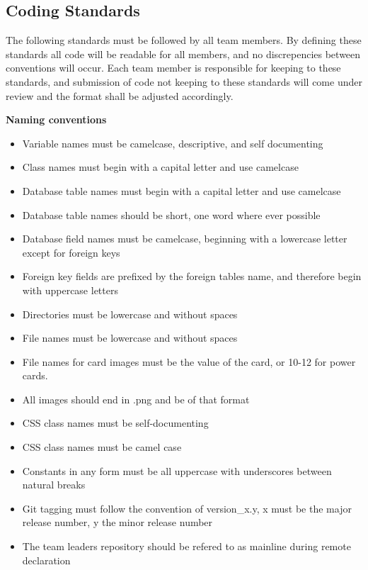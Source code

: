 \documentclass[12pt]{IEEEtran}
\begin{document}
\subsection{Coding Standards}
\label{subsec:coding}

	The following standards must be followed by all team members. By defining these standards all code will be readable for 		all members, and no discrepencies between conventions will occur. Each team member is responsible for keeping to these 	standards, and submission of code not keeping to these standards will come under review and the format shall be 			adjusted accordingly. 

	\bfseries Naming conventions \mdseries

	\begin{itemize}
		\item Variable names must be camelcase, descriptive, and self documenting
		\item Class names must begin with a capital letter and use camelcase 
		\item Database table names must begin with a capital letter and use camelcase
		\item Database table names should be short, one word where ever possible
		\item Database field names must be camelcase, beginning with a lowercase letter except for foreign keys
		\item Foreign key fields are prefixed by the foreign tables name, and therefore begin with uppercase letters
		\item Directories must be lowercase and without spaces
		\item File names must be lowercase and without spaces
		\item File names for card images must be the value of the card, or 10-12 for power cards.
		\item All images should end in .png and be of that format
		\item CSS class names must be self-documenting
		\item CSS class names must be camel case
		\item Constants in any form must be all uppercase with underscores between natural breaks
		\item Git tagging must follow the convention of version\_x.y, x must be the major release number, y the minor 					release number
		\item The team leaders repository should be refered to as mainline during remote declaration
	\end{itemize}
\end{document}
